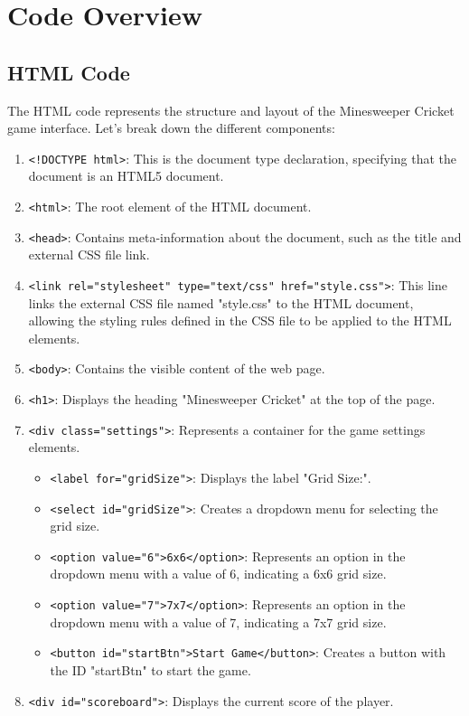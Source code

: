 \documentclass{article}
\begin{document}
\section{Code Overview}
\subsection{HTML Code}
The HTML code represents the structure and layout of the Minesweeper Cricket game interface. Let's break down the different components:
\begin{enumerate}

\item  \texttt{<!DOCTYPE html>}: This is the document type declaration, specifying that the document is an HTML5 document.

\item  \texttt{<html>}: The root element of the HTML document.

\item  \texttt{<head>}: Contains meta-information about the document, such as the title and external CSS file link.

\item  \texttt{<link rel="stylesheet" type="text/css" href="style.css">}: This line links the external CSS file named "style.css" to the HTML document, allowing the styling rules defined in the CSS file to be applied to the HTML elements.
\item \texttt{<body>}: Contains the visible content of the web page.
\item  \texttt{<h1>}: Displays the heading "Minesweeper Cricket" at the top of the page.

\item \texttt{<div class="settings">}: Represents a container for the game settings elements.
\begin{itemize}
   

   \item \texttt{<label for="gridSize">}: Displays the label "Grid Size:".
   \item  \texttt{<select id="gridSize">}: Creates a dropdown menu for selecting the grid size.
     \item  \texttt{<option value="6">6x6</option>}: Represents an option in the dropdown menu with a value of 6, indicating a 6x6 grid size.
     \item  \texttt{<option value="7">7x7</option>}: Represents an option in the dropdown menu with a value of 7, indicating a 7x7 grid size.
   \item  \texttt{<button id="startBtn">Start Game</button>}: Creates a button with the ID "startBtn" to start the game.
\end{itemize}
\item  \texttt{<div id="scoreboard">}: Displays the current score of the player.


\end{enumerate}
\end{document}
